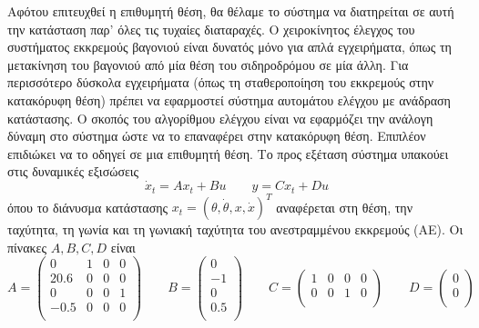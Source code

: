 \documentclass[a4paper,oneside, 12pt]{article}
\begin{document}
Αφότου επιτευχθεί η επιθυμητή θέση, θα θέλαμε το σύστημα να διατηρείται σε αυτή την κατάσταση παρ’ όλες τις τυχαίες διαταραχές. Ο χειροκίνητος έλεγχος του συστήματος εκκρεμούς βαγονιού είναι δυνατός μόνο για απλά εγχειρήματα, όπως τη μετακίνηση του βαγονιού από μία θέση του σιδηροδρόμου σε μία άλλη. Για περισσότερο δύσκολα εγχειρήματα (όπως τη σταθεροποίηση του εκκρεμούς στην κατακόρυφη θέση) πρέπει να εφαρμοστεί σύστημα αυτομάτου ελέγχου με ανάδραση κατάστασης. Ο σκοπός του αλγορίθμου ελέγχου είναι να εφαρμόζει την ανάλογη δύναμη στο σύστημα ώστε να το επαναφέρει στην κατακόρυφη θέση. Επιπλέον επιδιώκει να το οδηγεί σε μια επιθυμητή θέση. Το προς εξέταση σύστημα υπακούει στις δυναμικές εξισώσεις $$\dot x_t = Ax_t + Bu \qquad y = Cx_t + Du$$ όπου το διάνυσμα κατάστασης $x_t = (\theta, \dot \theta, x, \dot x)^T$ αναφέρεται στη θέση, την ταχύτητα, τη γωνία και τη γωνιακή ταχύτητα του ανεστραμμένου εκκρεμούς (ΑΕ). Οι πίνακες $A, B, C, D$ είναι 
$$ A = 
\begin{pmatrix} 
0 & 1 & 0 & 0 \\
20.6 & 0 & 0 & 0 \\
0  & 0 & 0 & 1 \\
-0.5 & 0 & 0 & 0 \\
\end{pmatrix}
\qquad B = 
\begin{pmatrix} 
0 \\ -1 \\ 0 \\ 0.5 \\
\end{pmatrix}
\qquad
C = 
\begin{pmatrix} 
1 & 0 & 0 & 0 \\ 0 & 0 & 1 & 0 \\
\end{pmatrix}
\qquad D = 
\begin{pmatrix} 
0 \\ 0 \\ 
\end{pmatrix}
$$
\end{document}
